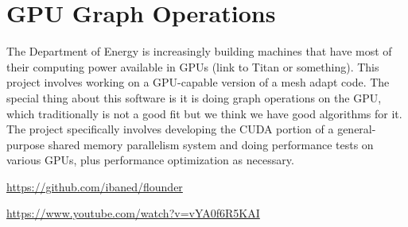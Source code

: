 \documentclass[12pt]{article}
\begin{document}
\section{GPU Graph Operations}
The Department of Energy is increasingly building machines that have most of
their computing power available in GPUs (link to Titan or something). This
project involves working on a GPU-capable version of a mesh adapt
code. The special thing about this software is it is doing graph operations on
the GPU, which traditionally is not a good fit but we think we have good
algorithms for it. The project specifically involves developing the CUDA
portion of a general-purpose shared memory parallelism system and doing
performance tests on various GPUs, plus performance optimization as necessary.

\url{https://github.com/ibaned/flounder}

\url{https://www.youtube.com/watch?v=vYA0f6R5KAI}
\end{document}
